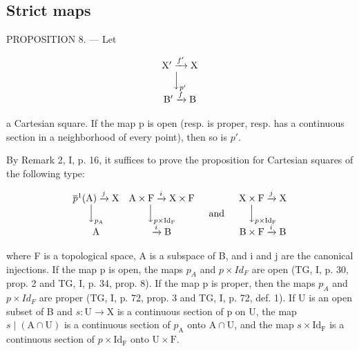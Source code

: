 \subsection{Strict maps}

PROPOSITION 8. --- Let

\[
\begin{array}{c} \mathrm {X^ {\prime}} \xrightarrow {f ^ {\prime}} \mathrm{X} \\ \Big \downarrow_ {p ^ {\prime}} \\ \mathrm {B^ {\prime}} \xrightarrow {f} \mathrm{B} \end{array}
\]

a Cartesian square. If the map p is open (resp. is proper, resp. has a continuous section in a neighborhood of every point), then so is \(p'\).

By Remark 2, I, p. 16, it suffices to prove the proposition for Cartesian squares of the following type:

\[
\begin{array}{c c} \overline {{p}} ^ {1} (\mathrm {A}) \xrightarrow {j} \mathrm{X} & \mathrm {A} \times \mathrm{F} \xrightarrow {i} \mathrm{X} \times \mathrm{F} \\ \Big \downarrow_ {p _ {\mathrm {A}}} & \Big \downarrow_ {p \times \mathrm {Id}_{\mathrm {F}}} \\ \mathrm {A} & \xrightarrow {i} \mathrm {B} \end{array} \quad\text {and} \quad \begin{array}{c} \mathrm {X} \times \mathrm {F} \xrightarrow {j} \mathrm {X} \\ \Big \downarrow_ {p \times \mathrm {Id}_{\mathrm {F}}} \\ \mathrm {B} \times \mathrm {F} \xrightarrow {i} \mathrm {B} \end{array}
\]

where F is a topological space, A is a subspace of B, and i and j are the canonical injections. If the map p is open, the maps \(p_{A}\) and \(p \times Id_{F}\) are open (TG, I, p. 30, prop. 2 and TG, I, p. 34, prop. 8). If the map p is proper, then the maps \(p_{A}\) and \(p \times Id_{F}\) are proper (TG, I, p. 72, prop. 3 and TG, I, p. 72, def. 1). If U is an open subset of B and \(s\colon\mathrm{U}\to\mathrm{X}\) is a continuous section of p on U, the map \(s\mid(\mathrm{A}\cap\mathrm{U})\) is a continuous section of \(p_{\mathrm{A}}\) onto \(\mathrm{A}\cap\mathrm{U}\), and the map \(s\times\mathrm{Id}_{\mathrm{F}}\) is a continuous section of \(p\times\mathrm{Id}_{\mathrm{F}}\) onto \(\mathrm{U}\times\mathrm{F}\).

